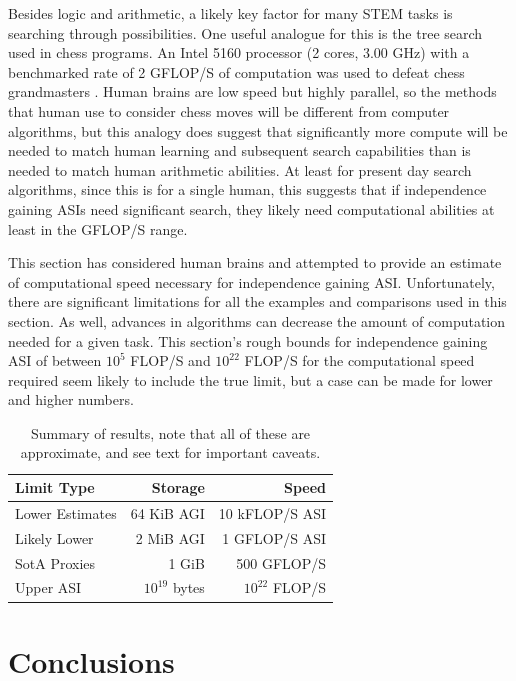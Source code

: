 \documentclass[letterpaper,twocolumn]{article}
\begin{document}
Besides logic and arithmetic, a likely key factor for many STEM tasks
is searching through possibilities.  One useful analogue for this is
the tree search used in chess programs.  An Intel 5160 processor (2
cores, 3.00 GHz) with a benchmarked rate of 2 GFLOP/S of computation
\citep{intel5160passmark} was used to defeat chess grandmasters
\citep{chessbase2006}.  Human brains are low speed but highly
parallel, so the methods that human use to consider chess moves will
be different from computer algorithms, but this analogy does suggest
that significantly more compute will be needed to match human learning
and subsequent search capabilities than is needed to match human
arithmetic abilities. At least for present day search algorithms,
since this is for a single human, this suggests that if independence
gaining ASIs need significant search, they likely need computational
abilities at least in the GFLOP/S range.

This section has considered human brains and attempted to provide an
estimate of computational speed necessary for independence gaining
ASI. Unfortunately, there are significant limitations for all the
examples and comparisons used in this section. As well, advances in
algorithms can decrease the amount of computation needed for a given
task. This section's rough bounds for independence gaining ASI of
between $10^5$ FLOP/S and $10^{22}$ FLOP/S for the computational speed
required seem likely to include the true limit, but a case can be made
for lower and higher numbers.


\begin{table}[htbp]
  \small
  \caption{Summary of results, note that all of these are approximate, and see text for important caveats.}
  \label{summarytable}
  \begin{tabular}{|l|r|r|}
    \hline
    Limit Type & Storage & Speed\\
    \hline
    Lower Estimates & 64 KiB AGI & 10 kFLOP/S ASI\\
    \hline
    Likely Lower & 2 MiB AGI & 1 GFLOP/S ASI\\
    \hline
    SotA Proxies & 1 GiB & 500 GFLOP/S\\
    \hline
    Upper ASI & $10^{19}$ bytes & $10^{22}$ FLOP/S\\
    \hline
  \end{tabular}
\end{table}


\section{Conclusions}
\end{document}
